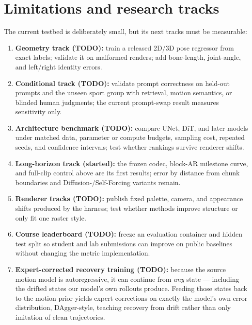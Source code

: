 \documentclass[10pt,twocolumn]{article}
\begin{document}
\section{Limitations and research tracks}\label{sec:future}
{\small
The current testbed is deliberately small, but its next tracks must be measurable:
\begin{enumerate}
\item \textbf{Geometry track (TODO):} train a released 2D/3D pose regressor from exact labels; validate it on malformed
renders; add bone-length, joint-angle, and left/right identity errors.
\item \textbf{Conditional track (TODO):} validate prompt correctness on held-out prompts and the unseen sport group
with retrieval, motion semantics, or blinded human judgments; the current prompt-swap result measures sensitivity only.
\item \textbf{Architecture benchmark (TODO):} compare UNet, DiT, and later models under matched data, parameter or
compute budgets, sampling cost, repeated seeds, and confidence intervals; test whether rankings survive renderer shifts.
\item \textbf{Long-horizon track (started):} the frozen codec, block-AR milestone curve, and full-clip control above
are its first results; error by distance from chunk boundaries and Diffusion-/Self-Forcing variants remain.
\item \textbf{Renderer tracks (TODO):} publish fixed palette, camera, and appearance shifts produced by the harness;
test whether methods improve structure or only fit one raster style.
\item \textbf{Course leaderboard (TODO):} freeze an evaluation container and hidden test split so student and lab
submissions can improve on public baselines without changing the metric implementation.
\item \textbf{Expert-corrected recovery training (TODO):} because the source motion model is autoregressive, it can
continue from \emph{any} state — including the drifted states our model's own rollouts produce. Feeding those states
back to the motion prior yields expert corrections on exactly the model's own error distribution, DAgger-style,
teaching recovery from drift rather than only imitation of clean trajectories.
\end{enumerate}
}
\end{document}
